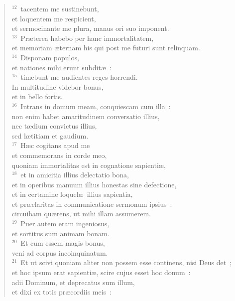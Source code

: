 \begin{flushleft}
\begin{verse}
${}^{12}$~tacentem me sustinebunt,\\ et loquentem me respicient,\\ et sermocinante me plura, manus ori suo imponent.\\
${}^{13}$~Pr\ae terea habebo per hanc immortalitatem,\\ et memoriam \ae ternam his qui post me futuri sunt relinquam.\\
${}^{14}$~Disponam populos,\\ et nationes mihi erunt subdit\ae~:\\
${}^{15}$~timebunt me audientes reges horrendi.\\ In multitudine videbor bonus,\\ et in bello fortis.\\
${}^{16}$~Intrans in domum meam, conquiescam cum illa~:\\ non enim habet amaritudinem conversatio illius,\\ nec t\ae dium convictus illius,\\ sed l\ae titiam et gaudium.\\
${}^{17}$~H\ae c cogitans apud me\\ et commemorans in corde meo,\\ quoniam immortalitas est in cognatione sapienti\ae ,\\
${}^{18}$~et in amicitia illius delectatio bona,\\ et in operibus manuum illius honestas sine defectione,\\ et in certamine loquel\ae\ illius sapientia,\\ et pr\ae claritas in communicatione sermonum ipsius~:\\ circuibam qu\ae rens, ut mihi illam assumerem.\\
${}^{19}$~Puer autem eram ingeniosus,\\ et sortitus sum animam bonam.\\
${}^{20}$~Et cum essem magis bonus,\\ veni ad corpus incoinquinatum.\\
${}^{21}$~Et ut scivi quoniam aliter non possem esse continens, nisi Deus det~;\\ et hoc ipsum erat sapienti\ae , scire cujus esset hoc donum~:\\ adii Dominum, et deprecatus sum illum,\\ et dixi ex totis pr\ae cordiis meis~:\end{verse}\end{flushleft}


